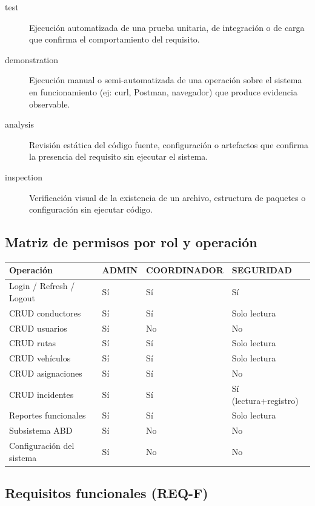 \documentclass[12pt,a4paper]{article}
\begin{document}
\begin{description}
  \item[test] Ejecución automatizada de una prueba unitaria, de integración o de carga que confirma el comportamiento del requisito.
  \item[demonstration] Ejecución manual o semi-automatizada de una operación sobre el sistema en funcionamiento (ej: curl, Postman, navegador) que produce evidencia observable.
  \item[analysis] Revisión estática del código fuente, configuración o artefactos que confirma la presencia del requisito sin ejecutar el sistema.
  \item[inspection] Verificación visual de la existencia de un archivo, estructura de paquetes o configuración sin ejecutar código.
\end{description}

\subsection{Matriz de permisos por rol y operación}
\label{sec:permisos}

\begin{longtable}{@{}p{5cm}p{2cm}p{2cm}p{2cm}@{}}
\toprule
\textbf{Operación} & \textbf{ADMIN} & \textbf{COORDINADOR} & \textbf{SEGURIDAD} \\
\midrule
\endhead
Login / Refresh / Logout & Sí & Sí & Sí \\
CRUD conductores & Sí & Sí & Solo lectura \\
CRUD usuarios & Sí & No & No \\
CRUD rutas & Sí & Sí & Solo lectura \\
CRUD vehículos & Sí & Sí & Solo lectura \\
CRUD asignaciones & Sí & Sí & No \\
CRUD incidentes & Sí & Sí & Sí (lectura+registro) \\
Reportes funcionales & Sí & Sí & Solo lectura \\
Subsistema ABD & Sí & No & No \\
Configuración del sistema & Sí & No & No \\
\bottomrule
\end{longtable}

\subsection{Requisitos funcionales (REQ-F)}
\label{sec:rf}
\end{document}
